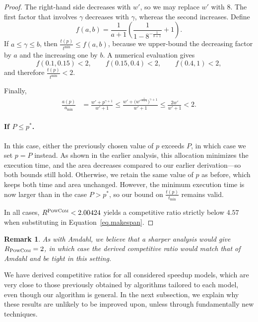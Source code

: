 \documentclass{article}
\newtheorem{remark}{Remark}
\newcommand\PCOM{\textsc{PowCom}\xspace}
\begin{document}
\begin{proof}
The right-hand side decreases with \(w'\), so we may replace \(w'\) with \(8\).  
The first factor that involves \(\gamma\) decreases with \(\gamma\), whereas the second increases.  
Define
\[
f(a,b)=\frac{1}{a+1}
        \left(
          \frac{1}{1-8^{-\frac{1}{b+1}}}+1
        \right).
\]
If \(a \le \gamma \le b\), then \(\tfrac{t(p)}{t^{\min}} \le f(a,b)\), because we upper-bound the decreasing factor by \(a\) and the increasing one by \(b\).  
A numerical evaluation gives
\[
f(0.1,0.15) < 2,\qquad
f(0.15,0.4) < 2,\qquad
f(0.4,1)   < 2,
\]
and therefore \(\frac{t(p)}{t^{\min}} < 2.\)

\medskip
\noindent
Finally,
\begin{align*}
\frac{a(p)}{a_{\min}}
   &= \frac{w'+p^{\gamma+1}}{w'+1} \le \frac{w'+\bigl(w'^{\frac{1}{\gamma+1}}\bigr)^{\gamma+1}}{w'+1}
   \le \frac{2w'}{w'+1} < 2 .
\end{align*}

\paragraph{If \( P \leq p^* \).}

In this case, either the previously chosen value of \( p \) exceeds \( P \), in which case we set \( p = P \) instead. As shown in the earlier analysis, this allocation minimizes the execution time, and the area decreases compared to our earlier derivation—so both bounds still hold. Otherwise, we retain the same value of \( p \) as before, which keeps both time and area unchanged. However, the minimum execution time is now larger than in the case \( P > p^* \), so our bound on \( \frac{t(p)}{t_{\min}} \) remains valid.

\smallskip
\noindent
In all cases, \(R^{\PCOM}<2.00424\) yields a competitive ratio strictly below \(4.57\) when substituting in Equation~\ref{eq.makespan}.

\end{proof}

\begin{remark}
As with Amdahl, we believe that a sharper analysis would give
$R_{\PCOM}=2$, in which case the derived competitive ratio would match that
of Amdahl and be tight in this setting.
\end{remark}

We have derived competitive ratios for all considered speedup models, which are very close to those previously obtained by algorithms tailored to each model, even though our algorithm is general. In the next subsection, we explain why these results are unlikely to be improved upon, unless through fundamentally new techniques.
\end{document}
